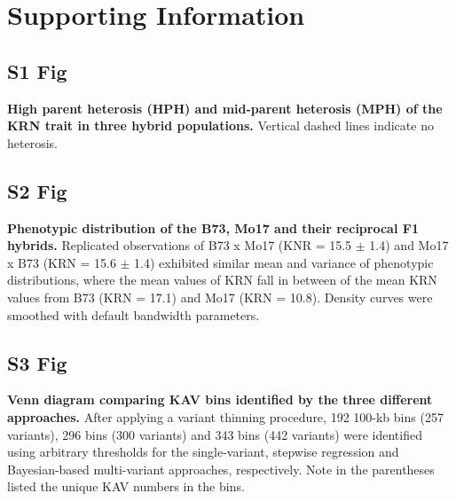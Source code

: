 \documentclass[10pt,letterpaper]{article}
\providecommand{\DIFaddend}{} %
\begin{document}
\DIFaddend %


\section*{Supporting Information}


\subsection*{S1 Fig}
\label{Fig_S1}
{\bf High parent heterosis (HPH) and mid-parent heterosis (MPH) of the KRN trait in three hybrid populations.} Vertical dashed lines indicate no heterosis.

\subsection*{S2 Fig}
\label{Fig_S2}
{\bf Phenotypic distribution of the B73, Mo17 and their reciprocal F1 hybrids.} Replicated observations of B73 x Mo17 (KNR = 15.5 $\pm$ 1.4) and Mo17 x B73 (KRN = 15.6 $\pm$ 1.4) exhibited similar mean and variance of phenotypic distributions, where the mean values of KRN fall in between of the mean KRN values from B73 (KRN = 17.1) and Mo17 (KRN = 10.8). Density curves were smoothed with default bandwidth parameters.

\subsection*{S3 Fig}
\label{Fig_S3}
{\bf Venn diagram comparing KAV bins identified by the three different approaches.} After applying a variant thinning procedure, 192 100-kb bins (257 variants), 296 bins (300 variants) and 343 bins (442 variants) were identified using arbitrary thresholds for the single-variant, stepwise regression and Bayesian-based multi-variant approaches, respectively. Note in the parentheses listed the unique KAV numbers in the bins.
\end{document}
